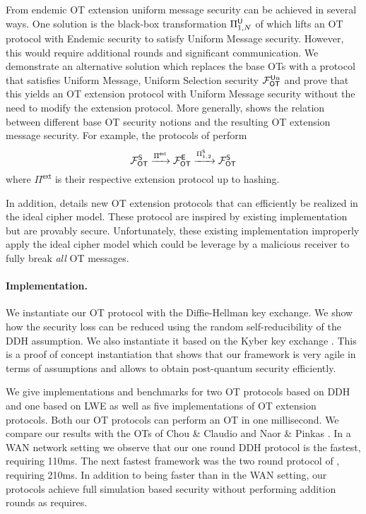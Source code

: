 From endemic OT extension uniform message security can be achieved in several ways. One solution is the black-box transformation $\Pi^\mathsf{U}_{1,N}$ of  which lifts an OT protocol with Endemic security to satisfy Uniform Message security. However, this would require additional rounds and significant communication. We demonstrate an alternative solution which replaces the base OTs with a protocol that satisfies Uniform Message, Uniform Selection security $\mathcal{F}_{\mathsf{OT}}^{\mathsf{U} u}$ and prove that this yields an OT extension protocol with Uniform Message security without the need to modify the extension protocol. More generally,  shows the relation between different base OT security notions and the resulting OT extension message security. 
\iffullversion
For example, the protocols of \cite{C:IKNP03,EC:ALSZ15,C:KelOrsSch15} perform
$$
\mathcal{F}_{\mathsf{OT}}^\mathsf{S} \xrightarrow{\Pi^{\textsf{ext}}} \mathcal{F}_{\mathsf{OT}}^\mathsf{E} \xrightarrow{\Pi^{\mathsf{S}}_{1,2}} \mathcal{F}_{\mathsf{OT}}^\mathsf{S}
$$
where $\Pi^\textsf{ext}$ is their respective extension protocol up to hashing.
\fi

In addition,  details new OT extension protocols that can efficiently be realized in the ideal cipher model. These protocol are inspired by existing implementation \cite{libOTe,KOS,EMP} but are provably secure. Unfortunately, these existing implementation improperly apply the ideal cipher model which could be leverage by a malicious receiver to fully break \emph{all} OT messages. 


\paragraph{Implementation.} We instantiate our OT protocol with the Diffie-Hellman key exchange. We show how the security loss can be reduced using the random self-reducibility of the DDH assumption. 
We also instantiate it based on the Kyber key exchange \cite{EPRINT:BDKLLS17,NISTPQC-R1:CRYSTALS-KYBER17}. This is a proof of concept instantiation that shows that our framework is very agile in terms of assumptions and allows to obtain post-quantum security efficiently. 

We give implementations and benchmarks for two OT protocols based on DDH and one based on LWE as well as five implementations of OT extension protocols. Both our OT protocols can perform an OT in one millisecond. We compare our results with the OTs of Chou \& Claudio \cite{LC:ChoOrl15} and Naor \& Pinkas \cite{SODA:NaoPin01}. In a WAN network setting we observe that our one round DDH protocol is the fastest, requiring 110ms. The next fastest framework was the two round protocol of \cite{LC:ChoOrl15}, requiring 210ms. In addition to being faster than \cite{LC:ChoOrl15} in the WAN setting, our protocols achieve full simulation based security without performing addition rounds as \cite{LC:ChoOrl15} requires. 

